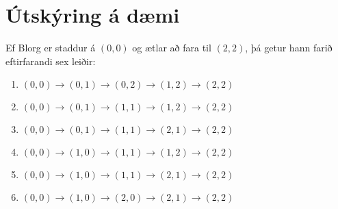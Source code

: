 \section*{Útskýring á dæmi}
Ef Blorg er staddur á $(0,0)$ og ætlar að fara til $(2,2)$, þá getur hann farið eftirfarandi sex leiðir:
\begin{enumerate}
    \item $(0,0) \rightarrow (0,1) \rightarrow (0,2) \rightarrow (1,2) \rightarrow (2,2)$
    \item $(0,0) \rightarrow (0,1) \rightarrow (1,1) \rightarrow (1,2) \rightarrow (2,2)$
    \item $(0,0) \rightarrow (0,1) \rightarrow (1,1) \rightarrow (2,1) \rightarrow (2,2)$
    \item $(0,0) \rightarrow (1,0) \rightarrow (1,1) \rightarrow (1,2) \rightarrow (2,2)$
    \item $(0,0) \rightarrow (1,0) \rightarrow (1,1) \rightarrow (2,1) \rightarrow (2,2)$
    \item $(0,0) \rightarrow (1,0) \rightarrow (2,0) \rightarrow (2,1) \rightarrow (2,2)$
\end{enumerate}

